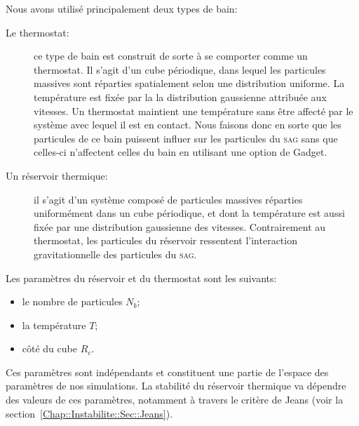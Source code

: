 	Nous avons utilisé principalement deux types de bain:
	\begin{description}

		\item[Le thermostat:] ce type de bain est construit de sorte à se comporter comme un
			thermostat. Il s'agit d'un cube périodique, dans lequel les particules massives sont
			réparties spatialement selon une distribution uniforme. La température est fixée par la
			la distribution gaussienne attribuée aux vitesses. Un thermostat maintient une
			température sans être affecté par le système avec lequel il est en contact.
			Nous faisons donc en sorte que les particules de ce bain puissent influer sur les
			particules du \textsc{sag} sans que celles-ci n'affectent celles du bain en utilisant
			une option de Gadget.

		\item[Un réservoir thermique:] il s'agit d'un système composé de particules massives réparties
			uniformément dans un cube périodique, et dont la température est aussi fixée par une
			distribution gaussienne des vitesses. Contrairement au thermostat, les particules du
			réservoir ressentent l'interaction gravitationnelle des particules du \textsc{sag}.


	\end{description}

	Les paramètres du réservoir et du thermostat sont les suivants:
	\begin{itemize}
		\item le nombre de particules $N_b$;
		\item la température $T$;
		\item côté du cube $R_c$.
	\end{itemize}
	Ces paramètres sont indépendants et constituent une partie de l'espace des paramètres de nos
	simulations. La stabilité du réservoir thermique va dépendre des valeurs de ces paramètres, notamment à
	travers le critère de Jeans (voir la section~\ref{Chap::Instabilite::Sec::Jeans}).

